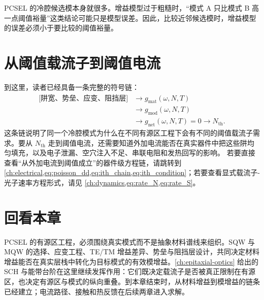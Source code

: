 PCSEL 的冷腔候选模本身就很多。增益模型过于粗糙时，“模式 A 只比模式 B 高一点阈值裕量”这类结论可能只是模型误差。因此，比较近邻候选模时，增益模型的误差必须小于要比较的阈值裕量。

\section{从阈值载流子到阈值电流}
到这里，读者已经具备一条完整的符号链：
\begin{equation}
\begin{aligned}
\bigl[\text{阱宽、势垒、应变、阻挡层}\bigr]
&\rightarrow g_{\mathrm{mat}}(\omega,N,T) \\
&\rightarrow g_{\mathrm{mod}}(\omega,N,T) \\
&\rightarrow g_{\mathrm{net}}(\omega,N,T)=0
\rightarrow N_{\mathrm{th}}.
\end{aligned}
\label{eq:symbol_chain_gain}
\end{equation}
这条链说明了同一个冷腔模式为什么在不同有源区工程下会有不同的阈值载流子需求。要从 $N_{\mathrm{th}}$ 走到阈值电流，还需要知道外加电流能否在真实器件中把这些阱均匀填充，以及电子泄漏、空穴注入不足、串联电阻和发热回写的影响。
若要直接查看“从外加电流到阈值成立”的器件级方程链，请跳转到 \cref{ch:electrical,eq:poisson_dd,eq:ith_chain,eq:ith_condition}；若要查看显式载流子-光子速率方程形式，请见 \cref{ch:dynamics,eq:rate_N,eq:rate_S}。

\section*{回看本章}
PCSEL 的有源区工程，必须围绕真实模式而不是抽象材料谱线来组织。SQW 与 MQW 的选择、应变工程、TE/TM 增益差异、势垒与阻挡层设计，共同决定材料增益能否在真实层栈中转化为目标模式的有效模增益。\cref{ch:epitaxial-optics} 给出的 SCH 与能带台阶在这里继续发挥作用：它们既决定载流子是否被真正限制在有源区，也决定有源区与模式的纵向重叠。到本章结束时，从材料增益到模增益的链条已经建立；电流路径、接触和热反馈在后续两章进入求解。

